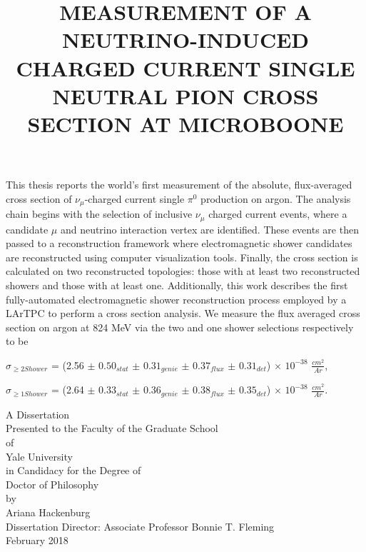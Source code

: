 This thesis reports the world's first measurement of the absolute, flux-averaged cross section of $\nu_{\mu}$-charged current single $\pi^0$ production on argon. The analysis chain begins with the selection of inclusive $\nu_\mu$ charged current events, where a candidate $\mu$ and neutrino interaction vertex are identified. These events are then passed to a reconstruction framework where electromagnetic shower candidates are reconstructed using computer visualization tools. Finally, the cross section is calculated on two reconstructed topologies: those with at least two reconstructed showers and those with at least one.  Additionally, this work describes the first fully-automated electromagnetic shower reconstruction process employed by a LArTPC to perform a cross section analysis.  We measure the flux averaged cross section on argon at 824 MeV via the two and one shower selections respectively to be 
\par \noindent $\sigma_{\geq2 Shower}$ =
(2.56 $\pm$ $0.50_{stat}$ $\pm$ $0.31_{genie}$ $\pm$ $0.37_{flux}$ $\pm$ $0.31_{det}$) $\times$ $10^{-38}$ $\frac{cm^2}{Ar}$, 
\par \noindent $\sigma_{\geq 1 Shower}$ = (2.64 $\pm$ $0.33_{stat}$ $\pm$ $0.36_{genie}$ $\pm$ $0.38_{flux}$ $\pm$ $0.35_{det}$) $\times$ $10^{-38}$ $\frac{cm^2}{Ar}$.

\thispagestyle{empty}
\clearpage

\singlespacing
\title{MEASUREMENT OF A NEUTRINO-INDUCED CHARGED CURRENT SINGLE NEUTRAL PION CROSS SECTION AT MICROBOONE}
\date{}
\author{}
\maketitle

\vspace{4 cm}

\begin{center}
A Dissertation \\
Presented to the Faculty of the Graduate School \\
of \\
Yale University \\
in Candidacy for the Degree of \\
Doctor of Philosophy\\ 

\vspace{6 cm}
by \\
Ariana Hackenburg \\
\vspace{3 mm}
Dissertation Director: Associate Professor Bonnie T. Fleming \\
\vspace{3 mm}
February 2018 \\ 
\end{center}
\thispagestyle{empty}

